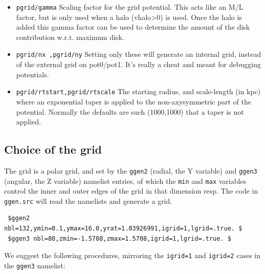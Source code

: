 \documentclass[10pt,dvips]{article}
\begin{document}
\begin{itemize}
\item
{\tt pgrid/gamma}
Scaling factor for the grid potential. This acts like an M/L factor,
but is only used when a halo (vhalo>0) is used.
Once the halo is added  this 
gamma factor can be used to determine the amount of the
disk contribution w.r.t. maximum disk.

\item
{\tt pgrid/nx ,pgrid/ny}
Setting only these will generate an internal grid, instead of the
external grid on pot0/pot1. It's really a cheat and meant for 
debugging potentials.

\item
{\tt pgrid/rtstart,pgrid/rtscale}
The starting radius, and scale-length (in kpc) where an
exponential taper is applied to the non-axysymmetric part
of the potential. Normally the defaults are such (1000,1000)
that a taper is not applied.

\end{itemize}


\subsection{Choice of the grid}

\bigskip

The grid is a polar grid, and set by the {\tt ggen2} (radial, the Y variable) 
and {\tt ggen3} (angular, the Z variable) namelist entries, 
of which the {\tt min} and {\tt max} variables control the 
inner and outer edges of the grid in that dimension resp. The code
in {\tt ggen.src} will read the namelists and generate a grid.

\begin{verbatim}
 $ggen2 nbl=132,ymin=0.1,ymax=16.0,yrat=1.03926991,igrid=1,lgrid=.true. $
 $ggen3 nbl=80,zmin=-1.5708,zmax=1.5708,igrid=1,lgrid=.true. $
\end{verbatim}


We suggest the following procedures, mirroring the {\tt igrid=1} and 
{\tt igrid=2} cases in the {\tt ggen3} namelist:
\end{document}
